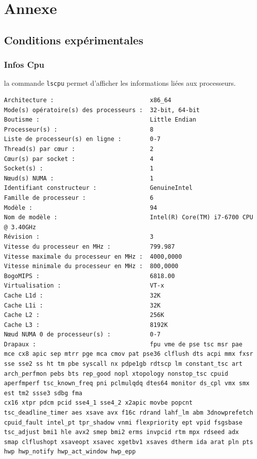 \documentclass[11pt]{article}
\theoremstyle{definition}
\theoremstyle{definition}
\theoremstyle{definition}
\begin{document}
\section{Annexe}
\subsection{Conditions expérimentales}

\subsubsection {Infos Cpu}
la commande \texttt{lscpu} permet d'afficher les informations liées aux processeurs.
\begin{lstlisting}[columns=fixed,basicstyle=\scriptsize\ttfamily]
Architecture :                           x86_64
Mode(s) opératoire(s) des processeurs :  32-bit, 64-bit
Boutisme :                               Little Endian
Processeur(s) :                          8
Liste de processeur(s) en ligne :        0-7
Thread(s) par cœur :                     2
Cœur(s) par socket :                     4
Socket(s) :                              1
Nœud(s) NUMA :                           1
Identifiant constructeur :               GenuineIntel
Famille de processeur :                  6
Modèle :                                 94
Nom de modèle :                          Intel(R) Core(TM) i7-6700 CPU @ 3.40GHz
Révision :                               3
Vitesse du processeur en MHz :           799.987
Vitesse maximale du processeur en MHz :  4000,0000
Vitesse minimale du processeur en MHz :  800,0000
BogoMIPS :                               6818.00
Virtualisation :                         VT-x
Cache L1d :                              32K
Cache L1i :                              32K
Cache L2 :                               256K
Cache L3 :                               8192K
Nœud NUMA 0 de processeur(s) :           0-7
Drapaux :                                fpu vme de pse tsc msr pae mce cx8 apic sep mtrr pge mca cmov pat pse36 clflush dts acpi mmx fxsr sse sse2 ss ht tm pbe syscall nx pdpe1gb rdtscp lm constant_tsc art arch_perfmon pebs bts rep_good nopl xtopology nonstop_tsc cpuid aperfmperf tsc_known_freq pni pclmulqdq dtes64 monitor ds_cpl vmx smx est tm2 ssse3 sdbg fma
cx16 xtpr pdcm pcid sse4_1 sse4_2 x2apic movbe popcnt tsc_deadline_timer aes xsave avx f16c rdrand lahf_lm abm 3dnowprefetch cpuid_fault intel_pt tpr_shadow vnmi flexpriority ept vpid fsgsbase tsc_adjust bmi1 hle avx2 smep bmi2 erms invpcid rtm mpx rdseed adx smap clflushopt xsaveopt xsavec xgetbv1 xsaves dtherm ida arat pln pts hwp hwp_notify hwp_act_window hwp_epp
\end{lstlisting}
\end{document}
